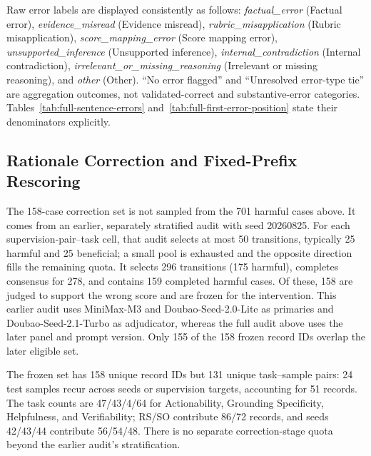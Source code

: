 Raw error labels are displayed consistently as follows:
\textit{factual\_error} (Factual error),
\textit{evidence\_misread} (Evidence misread),
\textit{rubric\_misapplication} (Rubric misapplication),
\textit{score\_mapping\_error} (Score mapping error),
\textit{unsupported\_inference} (Unsupported inference),
\textit{internal\_contradiction} (Internal contradiction),
\textit{irrelevant\_or\_missing\_reasoning} (Irrelevant or missing reasoning),
and \textit{other} (Other).
``No error flagged'' and ``Unresolved error-type tie'' are aggregation outcomes, not
validated-correct and substantive-error categories. Tables~\ref{tab:full-sentence-errors}
and~\ref{tab:full-first-error-position} state their denominators explicitly.

\subsection{Rationale Correction and Fixed-Prefix Rescoring}

The 158-case correction set is not sampled from the 701 harmful cases above.
It comes from an earlier, separately stratified audit with seed 20260825. For
each supervision-pair--task cell, that audit selects at most 50 transitions,
typically 25 harmful and 25 beneficial; a small pool is exhausted and the
opposite direction fills the remaining quota. It selects 296 transitions
(175 harmful), completes consensus for 278, and contains 159 completed harmful
cases. Of these, 158 are judged to support the wrong score and are frozen for
the intervention. This earlier audit uses MiniMax-M3 and
Doubao-Seed-2.0-Lite as primaries and Doubao-Seed-2.1-Turbo as adjudicator,
whereas the full audit above uses the later panel and prompt version.
Only 155 of the 158 frozen record IDs overlap the later eligible set.

The frozen set has 158 unique record IDs but 131 unique task--sample pairs:
24 test samples recur across seeds or supervision targets, accounting for 51
records. The task counts are 47/43/4/64 for Actionability, Grounding
Specificity, Helpfulness, and Verifiability; RS/SO contribute 86/72 records,
and seeds 42/43/44 contribute 56/54/48. There is no separate correction-stage
quota beyond the earlier audit's stratification.

